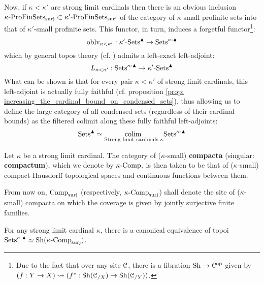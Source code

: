 \begin{remark}
                Now, if $\kappa < \kappa'$ are strong limit cardinals then there is an obvious inclusion $\kappa\text{-}\mathrm{Pro}\mathrm{Fin}\mathrm{Sets}_{\mathrm{surj}} \subset \kappa'\text{-}\mathrm{Pro}\mathrm{Fin}\mathrm{Sets}_{\mathrm{surj}}$ of the category of $\kappa$-small profinite sets into that of $\kappa'$-small profinite sets. This functor, in turn, induces a forgetful functor\footnote{Due to the fact that over any site $\mathcal{C}$, there is a fibration $\mathrm{Sh} \to \mathcal{C}^{\mathrm{op}}$ given by $(f: Y \to X) \leadsto (f^*: \mathrm{Sh}({\mathcal{C}_{/X}}) \to \mathrm{Sh}(\mathcal{C}_{/Y}))$.}:
                    $$\mathrm{oblv}_{\kappa < \kappa'}: \kappa'\text{-}\mathrm{Sets}^{\blacktriangle} \to \mathrm{Sets}^{\kappa\text{-}\blacktriangle}$$
                which by general topos theory (cf. \cite[Expos\'e IV]{sga4}) admits a left-exact left-adjoint:
                    $$L_{\kappa < \kappa'}: \mathrm{Sets}^{\kappa\text{-}\blacktriangle} \to \kappa'\text{-}\mathrm{Sets}^{\blacktriangle}$$
                What can be shown is that for every pair $\kappa < \kappa'$ of strong limit cardinals, this left-adjoint is actually fully faithful (cf. proposition \ref{prop: increasing_the_cardinal_bound_on_condensed_sets}), thus allowing us to define the large category of all condensed sets (regardless of their cardinal bounds) as the filtered colimit along these fully faithful left-adjoints:
                    $$\mathrm{Sets}^{\blacktriangle} \simeq \underset{ \text{Strong limit cardinals $\kappa$} }{\operatorname{colim} \:} \mathrm{Sets}^{\kappa\text{-}\blacktriangle}$$
            \end{remark}
            \begin{definition}[Compacta] \label{def: compacta}
                Let $\kappa$ be a strong limit cardinal. The category of ($\kappa$-small) \textbf{compacta} (singular: \textbf{compactum}), which we denote by $\kappa\text{-}\mathrm{Comp}$, is then taken to be that of ($\kappa$-small) compact Hausdorff topological spaces and continuous functions between them. 
            \end{definition}
            \begin{convention} \label{conv: site_of_compacta}
                From now on, $\mathrm{Comp}_{\mathrm{surj}}$ (respectively, $\kappa\text{-}\mathrm{Comp}_{\mathrm{surj}}$) shall denote the site of ($\kappa$-small) compacta on which the coverage is given by jointly surjective finite families.
            \end{convention}
            \begin{lemma} \label{lemma: condensed_sets_as_sheaves_on_compacta}
                For any strong limit cardinal $\kappa$, there is a canonical equivalence of topoi $\mathrm{Sets}^{\kappa\text{-}\blacktriangle} \simeq \mathrm{Sh}(\kappa\text{-}\mathrm{Comp}_{\mathrm{surj}})$.
            \end{lemma}
